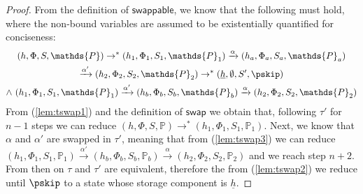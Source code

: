 \begin{lem}
\begin{proof}
	From the definition of $\mathsf{swappable}$, we know that the following must hold, where the non-bound variables are assumed to be existentially quantified for conciseness:
	\begin{gather}
		\label{lem:tswap1}
		(h, \Phi, S, \mathds{P})
			\rightarrow^*
		(h_1, \Phi_1, S_1, \mathds{P}_1)
			\xrightarrow{\alpha}
		(h_a, \Phi_a, S_a, \mathds{P}_a) \\
		\label{lem:tswap2}
			\xrightarrow{\alpha'}
		(h_2, \Phi_2, S_2, \mathds{P}_2)
			\rightarrow^*
		(\underline{h}, \emptyset, S', \pskip) \\
		\label{lem:tswap3}
			\land\
		(h_1, \Phi_1, S_1, \mathds{P}_1)
			\xrightarrow{\alpha'}
		(h_b, \Phi_b, S_b, \mathds{P}_b)
			\xrightarrow{\alpha}
		(h_2, \Phi_2, S_2, \mathds{P}_2)
	\end{gather}
	From (\ref{lem:tswap1}) and the definition of $\mathsf{swap}$ we obtain that, following $\tau'$ for $n - 1$ steps we can reduce $(h, \Phi, S, \mathds{P}) \rightarrow^* (h_1, \Phi_1, S_1, \mathds{P}_1)$. Next, we know that $\alpha$ and $\alpha'$ are swapped in $\tau'$, meaning that from (\ref{lem:tswap3}) we can reduce $(h_1, \Phi_1, S_1, \mathds{P}_1) \xrightarrow{\alpha'} (h_b, \Phi_b, S_b, \mathds{P}_b) \xrightarrow{\alpha} (h_2, \Phi_2, S_2, \mathds{P}_2)$ and we reach step $n+2$. From then on $\tau$ and $\tau'$ are equivalent, therefore the from (\ref{lem:tswap2}) we reduce until $\pskip$ to a state whose storage component is $\underline{h}$.
	\end{proof}
\end{lem}